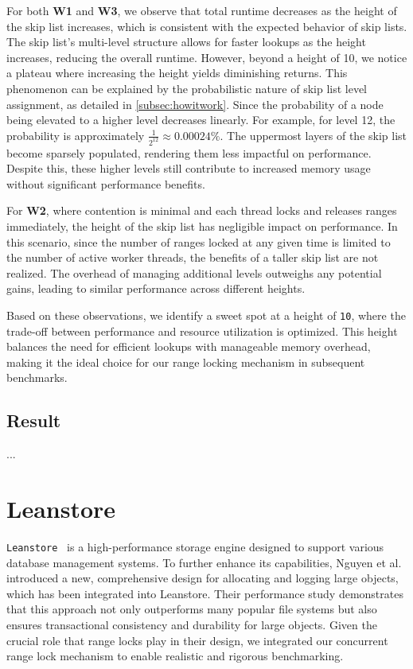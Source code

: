 For both \textbf{W1} and \textbf{W3}, we observe that total runtime decreases as the height of the skip list increases, which is consistent with the expected behavior of skip lists. The skip list's multi-level structure allows for faster lookups as the height increases, reducing the overall runtime. However, beyond a height of 10, we notice a plateau where increasing the height yields diminishing returns. This phenomenon can be explained by the probabilistic nature of skip list level assignment, as detailed in \ref{subsec:howitwork}. Since the probability of a node being elevated to a higher level decreases linearly. For example, for level 12, the probability is approximately \(\frac{1}{2^{12}} \approx 0.00024\%\). The uppermost layers of the skip list become sparsely populated, rendering them less impactful on performance. Despite this, these higher levels still contribute to increased memory usage without significant performance benefits.

For \textbf{W2}, where contention is minimal and each thread locks and releases ranges immediately, the height of the skip list has negligible impact on performance. In this scenario, since the number of ranges locked at any given time is limited to the number of active worker threads, the benefits of a taller skip list are not realized. The overhead of managing additional levels outweighs any potential gains, leading to similar performance across different heights.

Based on these observations, we identify a sweet spot at a height of \texttt{10}, where the trade-off between performance and resource utilization is optimized. This height balances the need for efficient lookups with manageable memory overhead, making it the ideal choice for our range locking mechanism in subsequent benchmarks.

\subsection{Result}

... 

\section{Leanstore}

\texttt{Leanstore}~\parencite{leis2018leanstore} is a high-performance storage engine designed to support various database management systems. To further enhance its capabilities, Nguyen et al.~\parencite{nguyen2024files} introduced a new, comprehensive design for allocating and logging large objects, which has been integrated into Leanstore. Their performance study demonstrates that this approach not only outperforms many popular file systems but also ensures transactional consistency and durability for large objects. Given the crucial role that range locks play in their design, we integrated our concurrent range lock mechanism to enable realistic and rigorous benchmarking.

